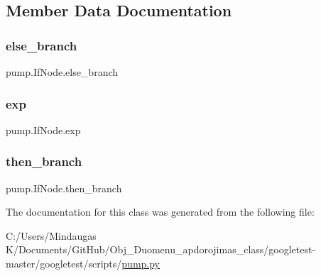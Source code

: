 \subsection{Member Data Documentation}
\mbox{\label{classpump_1_1_if_node_a12e422b16ed4291f15cd95cd6e7f81eb}} 
\subsubsection{\texorpdfstring{else\_branch}{else\_branch}}
{\footnotesize\ttfamily pump.\+If\+Node.\+else\+\_\+branch}

\mbox{\label{classpump_1_1_if_node_a92042e4262196ffd7366350539f512d8}} 
\subsubsection{\texorpdfstring{exp}{exp}}
{\footnotesize\ttfamily pump.\+If\+Node.\+exp}

\mbox{\label{classpump_1_1_if_node_aa9e2e488564629f8dc0d64d165a19ffa}} 
\subsubsection{\texorpdfstring{then\_branch}{then\_branch}}
{\footnotesize\ttfamily pump.\+If\+Node.\+then\+\_\+branch}



The documentation for this class was generated from the following file\+:\begin{DoxyCompactItemize}
\item 
C\+:/\+Users/\+Mindaugas K/\+Documents/\+Git\+Hub/\+Obj\+\_\+\+Duomenu\+\_\+apdorojimas\+\_\+class/googletest-\/master/googletest/scripts/\mbox{\hyperlink{googletest-master_2googletest_2scripts_2pump_8py}{pump.\+py}}\end{DoxyCompactItemize}
